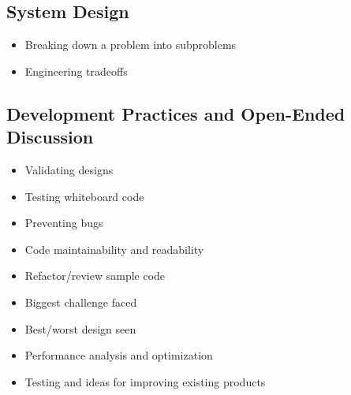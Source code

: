 \documentclass{article}
\begin{document}
\subsection{System Design}
\begin{itemize}
    \item Breaking down a problem into subproblems
    \item Engineering tradeoffs
\end{itemize}

\subsection{Development Practices and Open-Ended Discussion}
\begin{itemize}
    \item Validating designs
    \item Testing whiteboard code
    \item Preventing bugs
    \item Code maintainability and readability
    \item Refactor/review sample code
    \item Biggest challenge faced
    \item Best/worst design seen
    \item Performance analysis and optimization
    \item Testing and ideas for improving existing products
\end{itemize}
\end{document}
